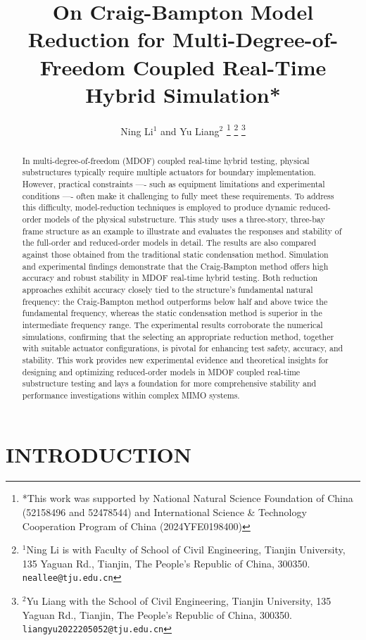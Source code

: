 \documentclass[a4paper, 10pt, conference]{ieeeconf}      %
\title{\LARGE \bf
On Craig-Bampton Model Reduction for Multi-Degree-of-Freedom Coupled Real-Time Hybrid Simulation*
}
\author{Ning Li$^{1}$ and Yu Liang$^{2}$%
\thanks{*This work was supported by National Natural Science Foundation of China (52158496 and 52478544) and International Science \& Technology Cooperation Program of China (2024YFE0198400)}%
\thanks{$^{1}$Ning Li is with Faculty of School of Civil Engineering,
        Tianjin University, 135 Yaguan Rd., Tianjin, The People's Republic of China, 300350.
        {\tt\small neallee@tju.edu.cn}}%
\thanks{$^{2}$Yu Liang with the School of Civil Engineering,
        Tianjin University, 135 Yaguan Rd., Tianjin, The People's Republic of China, 300350.
        {\tt\small liangyu2022205052@tju.edu.cn}}%
}
\begin{document}
\maketitle
\thispagestyle{empty}
\pagestyle{empty}


\begin{abstract}

In multi-degree-of-freedom (MDOF) coupled real-time hybrid testing, physical substructures typically require multiple actuators for boundary implementation. However, practical constraints —- such as equipment limitations and experimental conditions —- often make it challenging to fully meet these requirements. To address this difficulty, model-reduction techniques is employed to produce dynamic reduced-order models of the physical substructure. This study uses a three-story, three-bay frame structure as an example to illustrate and evaluates the responses and stability of the full-order and reduced-order models in detail. The results are also compared against those obtained from the traditional static condensation method. Simulation and experimental findings demonstrate that the Craig-Bampton method offers high accuracy and robust stability in MDOF real-time hybrid testing. Both reduction approaches exhibit accuracy closely tied to the structure’s fundamental natural frequency: the Craig-Bampton method outperforms below half and above twice the fundamental frequency, whereas the static condensation method is superior in the intermediate frequency range. The experimental results corroborate the numerical simulations, confirming that the selecting an appropriate reduction method, together with suitable actuator configurations, is pivotal for enhancing test safety, accuracy, and stability. This work provides new experimental evidence and theoretical insights for designing and optimizing reduced-order models in MDOF coupled real-time substructure testing and lays a foundation for more comprehensive stability and performance investigations within complex MIMO systems.


\end{abstract}


\section{INTRODUCTION} \label{sec1}
\end{document}
